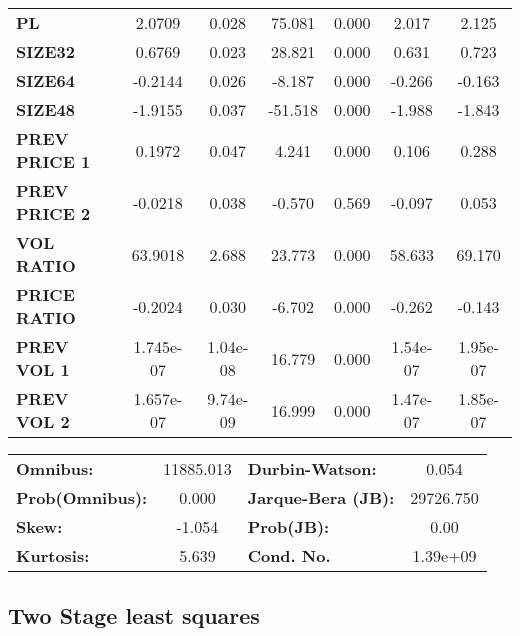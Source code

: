 \documentclass{article}
\begin{document}
\begin{center}
\begin{tabular}{lcccccc}
\textbf{PL}    &       2.0709  &        0.028     &    75.081  &         0.000        &        2.017    &        2.125     \\
\textbf{SIZE32}    &       0.6769  &        0.023     &    28.821  &         0.000        &        0.631    &        0.723     \\
\textbf{SIZE64}    &      -0.2144  &        0.026     &    -8.187  &         0.000        &       -0.266    &       -0.163     \\
\textbf{SIZE48}   &      -1.9155  &        0.037     &   -51.518  &         0.000        &       -1.988    &       -1.843     \\
\textbf{PREV PRICE 1}   &       0.1972  &        0.047     &     4.241  &         0.000        &        0.106    &        0.288     \\
\textbf{PREV PRICE 2}   &      -0.0218  &        0.038     &    -0.570  &         0.569        &       -0.097    &        0.053     \\
\textbf{VOL RATIO}   &      63.9018  &        2.688     &    23.773  &         0.000        &       58.633    &       69.170     \\
\textbf{PRICE RATIO}   &      -0.2024  &        0.030     &    -6.702  &         0.000        &       -0.262    &       -0.143     \\
\textbf{PREV VOL 1}   &    1.745e-07  &     1.04e-08     &    16.779  &         0.000        &     1.54e-07    &     1.95e-07     \\
\textbf{PREV VOL 2}   &    1.657e-07  &     9.74e-09     &    16.999  &         0.000        &     1.47e-07    &     1.85e-07     \\
\bottomrule
\end{tabular}
\begin{tabular}{lclc}
\textbf{Omnibus:}       & 11885.013 & \textbf{  Durbin-Watson:     } &     0.054  \\
\textbf{Prob(Omnibus):} &    0.000  & \textbf{  Jarque-Bera (JB):  } & 29726.750  \\
\textbf{Skew:}          &   -1.054  & \textbf{  Prob(JB):          } &      0.00  \\
\textbf{Kurtosis:}      &    5.639  & \textbf{  Cond. No.          } &  1.39e+09  \\
\bottomrule
\end{tabular}
\end{center}


\subsection{Two Stage least squares}
\end{document}
